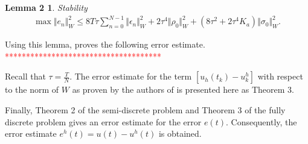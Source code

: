 \documentclass[../../main.tex]{subfiles}
\begin{document}
\newtheorem*{DC_Lem3}{Lemma 2}
\begin{DC_Lem3}
	Stability
	\begin{eqnarray*}
		\max\Vert e_{n}\Vert_{W}^{2}\leq 8T\tau\sum_{n=0}^{N-1}\Vert\epsilon_{n}\Vert_{W}^{2}+2\tau^{4}\Vert\rho_{0}\Vert_{W}^{2}+(8\tau^{2}+2\tau^{4}K_{a})\Vert\sigma_{0}\Vert_{W}^{2}.
	\end{eqnarray*}
\end{DC_Lem3}

Using this lemma, \cite{BV13} proves the following error estimate.\\
\textcolor{red}{*************************************}

Recall that $\displaystyle \tau = \frac{T}{N}$. The error estimate for the term $[u_h(t_k) - u^h_k]$ with respect to the norm of $W$ as proven by the authors of \cite{BV13} is presented here as Theorem 3.



Finally, Theorem 2 of the semi-discrete problem and Theorem 3 of the fully discrete problem gives an error estimate for the error $e(t)$. Consequently, the error estimate $e^h(t) = u(t) - u^h(t)$ is obtained.
\end{document}
